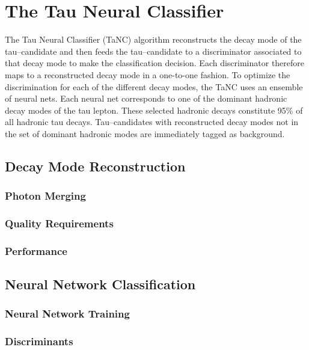 \section{The Tau Neural Classifier}
\label{sec:Tanc}
%
The Tau Neural Classifier (TaNC) algorithm reconstructs the decay mode of the
tau--candidate and then feeds the tau--candidate to a discriminator associated
to that decay mode to make the classification decision.  Each discriminator
therefore maps to a reconstructed decay mode in a one-to-one fashion.  To
optimize the discrimination for each of the different decay modes, the TaNC uses
an ensemble of neural nets.  Each neural net corresponds to one of the dominant
hadronic decay modes of the tau lepton.  These selected hadronic decays
constitute 95\% of all hadronic tau decays.  Tau--candidates with reconstructed
decay modes not in the set of dominant hadronic modes are immediately tagged as
background.  

\subsection{Decay Mode Reconstruction}
\label{sec:decay_mode_reco}

\subsubsection{Photon Merging}

\subsubsection{Quality Requirements}

\subsubsection{Performance}


\subsection{Neural Network Classification}
\label{sec:tanc_nn_training}
\subsubsection{Neural Network Training}

\subsubsection{Discriminants}
\label{sec:tanc_nn_discriminants}

